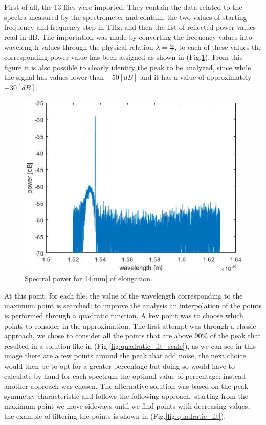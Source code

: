 \newpage
{}
First of all, the 13 files were imported. They contain the data related to the spectra measured by the spectrometer and contain: the two values of starting frequency and frequency step in THz; and then the list of reflected power values read in dB. The importation was made by converting the frequency values into wavelength values through the physical relation $\lambda = \frac{c_0}{f}$, to each of these values the corresponding power value has been assigned as shown in (Fig.\ref{fig:spectralPower}). From this figure it is also possible to clearly identify the peak to be analyzed, since while the signal has values lower than $-50[dB]$ and it has a value of approximately $-30[dB]$.
\begin{figure}[h]
    \centering
    \includegraphics[scale=0.7]{img/spectralPower.jpg}
    \caption{Spectral power for 14[mm] of elongation.}
    \label{fig:spectralPower}
\end{figure}
At this point, for each file, the value of the wavelength corresponding to the maximum point is searched; to improve the analysis an interpolation of the points is performed through a quadratic function. A key point was to choose which points to consider in the approximation. The first attempt was through a classic approach, we chose to consider all the points that are above 90\% of the peak that resulted in a solution like in (Fig.\ref{fig:quadratic_fit_scale}), as we can see in this image there are a few points around the peak that add noise, the next choice would then be to opt for a greater percentage but doing so would have to calculate by hand for each spectrum the optimal value of percentage; instead another approach was chosen.
The alternative solution was based on the peak symmetry characteristic and follows the following approach: starting from the maximum point we move sideways until we find points with decreasing values, the example of filtering the points is shown in (Fig.\ref{fig:quadratic_fit}).

